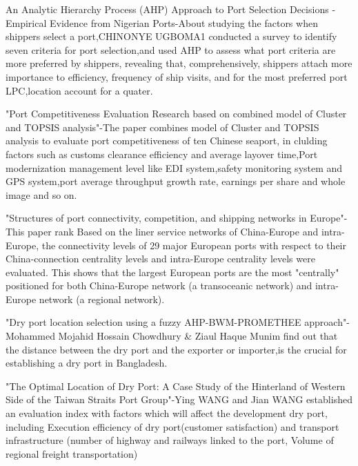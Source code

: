 \documentclass[preprint]{elsarticle}
\begin{document}
An Analytic Hierarchy Process (AHP) Approach to Port Selection Decisions - Empirical Evidence from Nigerian Ports-About studying the factors when shippers select a port,CHINONYE UGBOMA1 conducted a survey to identify seven criteria for port selection,and used AHP to assess what port criteria are more preferred by shippers, revealing that, comprehensively, shippers attach more importance to efficiency, frequency of ship visits, and for the most preferred port LPC,location account for a quater.

"Port Competitiveness Evaluation Research based on combined model of Cluster and TOPSIS analysis"-The paper combines model of Cluster and TOPSIS analysis to evaluate port competitiveness of ten Chinese seaport, in clulding factors such as customs clearance efficiency and average layover time,Port modernization  management level like EDI system,safety monitoring system and GPS system,port average throughput growth rate, earnings per share and whole image and so on.

% 
"Structures of port connectivity, competition, and shipping networks in Europe"-This paper rank Based on the liner service networks of China-Europe and intra-Europe, the connectivity levels of 29 major European ports with respect to their China-connection centrality levels and intra-Europe centrality levels were evaluated. This shows that the largest European ports are the most "centrally" positioned for both China-Europe network (a transoceanic network) and intra-Europe network (a regional network).

"Dry port location selection using a fuzzy AHP-BWM-PROMETHEE approach"-Mohammed Mojahid Hossain Chowdhury \& Ziaul Haque Munim find out that the distance between the dry port and the exporter or importer,is the crucial for establishing a dry port in Bangladesh.

"The Optimal Location of Dry Port: A Case Study of the Hinterland of Western Side of the Taiwan Straits Port Group"-Ying WANG and Jian WANG established an evaluation index with factors which will affect the development dry port, including Execution efficiency of dry port(customer satisfaction) and transport infrastructure (number of highway and railways linked to the port, Volume of regional freight transportation)
% 
% 
% 
% 
% 
% 
% 
% 
\end{document}

